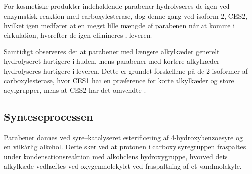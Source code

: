     For kosmetiske produkter indeholdende parabener hydrolyseres de igen ved enzymatisk reaktion med carboxylesterase, dog denne gang ved isoform 2, CES2, hvilket igen medfører at en meget lille mængde af parabenen når at komme i cirkulation, hvorefter de igen elimineres i leveren.

    Samtidigt observeres det at parabener med længere alkylkæder generelt hydrolyseret hurtigere i huden, mens parabener med kortere alkylkæder hydrolyseres hurtigere i leveren. Dette er grundet forskellene på de 2 isoformer af carboxylesterase, hvor CES1 har en præference for korte alkylkæder og store acylgrupper, mens at CES2 har det omvendte \parencite{Cath2021}.

    \subsection{Synteseprocessen}
    Parabener dannes ved syre--katalyseret esterificering af 4-hydroxybenzoesyre og en vilkårlig alkohol. Dette sker ved at protonen i carboxylsyregruppen fraspaltes under kondensationsreaktion med alkoholens hydroxygruppe, hvorved dets alkylkæde vedhæftes ved oxygenmolekylet ved fraspaltning af et vandmolekyle.

